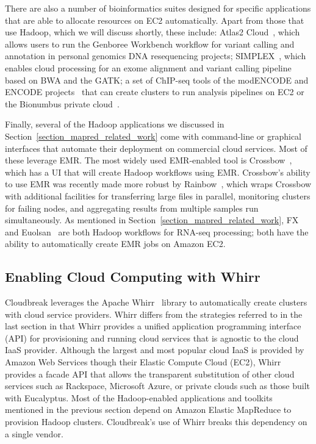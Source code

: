 There are also a number of bioinformatics suites designed for specific applications that are able to allocate resources on EC2 automatically. Apart from those that use Hadoop, which we will discuss shortly, these include: Atlas2 Cloud~\cite{Evani:2012eq}, which allows users to run the Genboree Workbench workflow for variant calling and annotation in personal genomics DNA resequencing projects; SIMPLEX~\cite{Fischer:2012bt}, which enables cloud processing for an exome alignment and variant calling pipeline based on BWA and the GATK; a set of ChIP-seq tools of the modENCODE and ENCODE projects~\cite{Trinh:2013ii} that can create clusters to run analysis pipelines on EC2 or the Bionumbus private cloud~\cite{bionimbus}.

Finally, several of the Hadoop applications we discussed in Section~\ref{section_mapred_related_work} come with command-line or graphical interfaces that automate their deployment on commercial cloud services. Most of these leverage EMR. The most widely used EMR-enabled tool is Crossbow~\cite{Langmead:2009p1225}, which has a UI that will create Hadoop workflows using EMR. Crossbow's ability to use EMR was recently made more robust by Rainbow~\cite{Zhao:2013hj}, which wraps Crossbow with additional facilities for transferring large files in parallel, monitoring clusters for failing nodes, and aggregating results from multiple samples run simultaneously. As mentioned in Section~\ref{section_mapred_related_work}, FX~\cite{Hong:2012du} and Euolsan~\cite{Jourdren:2012dc} are both Hadoop workflows for RNA-seq processing; both have the ability to automatically create EMR jobs on Amazon EC2.

\subsection{Enabling Cloud Computing with Whirr}

Cloudbreak leverages the Apache Whirr~\cite{whirr} library to automatically create clusters with cloud service providers. Whirr differs from the strategies referred to in the last section in that Whirr provides a unified application programming interface (API) for provisioning and running cloud services that is agnostic to the cloud IaaS provider. Although the largest and most popular cloud IaaS is provided by Amazon Web Services though their Elastic Compute Cloud (EC2), Whirr provides a facade API that allows the transparent substitution of other cloud services such as Rackspace, Microsoft Azure, or private clouds such as those built with Eucalyptus. Most of the Hadoop-enabled applications and toolkits mentioned in the previous section depend on Amazon Elastic MapReduce to provision Hadoop clusters. Cloudbreak's use of Whirr breaks this dependency on a single vendor.

